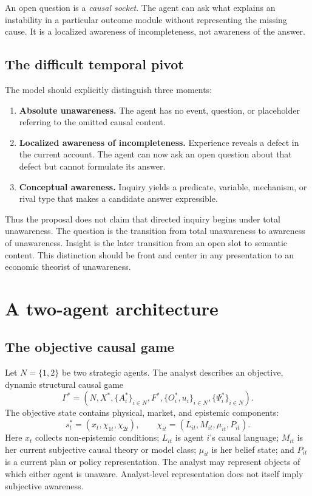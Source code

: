 \documentclass[11pt]{article}
\begin{document}
	An open question is a \emph{causal socket}.  The agent can ask what explains an instability in a particular outcome module without representing the missing cause.  It is a localized awareness of incompleteness, not awareness of the answer.
	
	\subsection{The difficult temporal pivot}
	
	The model should explicitly distinguish three moments:
	\begin{enumerate}
		\item \textbf{Absolute unawareness.}  The agent has no event, question, or placeholder referring to the omitted causal content.
		\item \textbf{Localized awareness of incompleteness.}  Experience reveals a defect in the current account.  The agent can now ask an open question about that defect but cannot formulate its answer.
		\item \textbf{Conceptual awareness.}  Inquiry yields a predicate, variable, mechanism, or rival type that makes a candidate answer expressible.
	\end{enumerate}
	
	Thus the proposal does not claim that directed inquiry begins under total unawareness.  The question is the transition from total unawareness to awareness of unawareness.  Insight is the later transition from an open slot to semantic content.  This distinction should be front and center in any presentation to an economic theorist of unawareness.
	
	\section{A two-agent architecture}
	
	\subsection{The objective causal game}
	
	Let $N=\{1,2\}$ be two strategic agents.  The analyst describes an objective, dynamic structural causal game
	\begin{equation}
		\Gamma^*=
		\left(N,X^*,\{A_i^*\}_{i\in N},F^*,\{O_i^*,u_i\}_{i\in N},\{\Psi_i^*\}_{i\in N}\right).
	\end{equation}
	The objective state contains physical, market, and epistemic components:
	\begin{equation}
		s_t^*=(x_t,\chi_{1t},\chi_{2t}),
		\qquad
		\chi_{it}=(L_{it},M_{it},\mu_{it},P_{it}).
	\end{equation}
	Here $x_t$ collects non-epistemic conditions; $L_{it}$ is agent $i$'s causal language; $M_{it}$ is her current subjective causal theory or model class; $\mu_{it}$ is her belief state; and $P_{it}$ is a current plan or policy representation.  The analyst may represent objects of which either agent is unaware.  Analyst-level representation does not itself imply subjective awareness.
	
\end{document}
